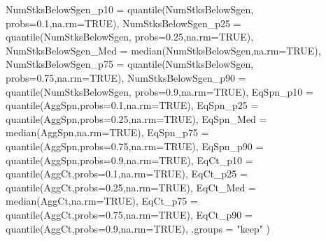 \documentclass[french,11pt]{book}
\newenvironment{Shaded}{\begin{snugshade}}{\end{snugshade}}
\newcommand{\AttributeTok}[1]{\textcolor[rgb]{0.77,0.63,0.00}{#1}}
\newcommand{\ConstantTok}[1]{\textcolor[rgb]{0.00,0.00,0.00}{#1}}
\newcommand{\FloatTok}[1]{\textcolor[rgb]{0.00,0.00,0.81}{#1}}
\newcommand{\FunctionTok}[1]{\textcolor[rgb]{0.00,0.00,0.00}{#1}}
\newcommand{\NormalTok}[1]{#1}
\newcommand{\StringTok}[1]{\textcolor[rgb]{0.31,0.60,0.02}{#1}}
\begin{document}
\begin{Shaded}
\begin{Highlighting}[]
              \AttributeTok{NumStksBelowSgen\_p10 =} \FunctionTok{quantile}\NormalTok{(NumStksBelowSgen,}
                       \AttributeTok{probs=}\FloatTok{0.1}\NormalTok{,}\AttributeTok{na.rm=}\ConstantTok{TRUE}\NormalTok{),}
              \AttributeTok{NumStksBelowSgen\_p25 =} \FunctionTok{quantile}\NormalTok{(NumStksBelowSgen,}
                       \AttributeTok{probs=}\FloatTok{0.25}\NormalTok{,}\AttributeTok{na.rm=}\ConstantTok{TRUE}\NormalTok{),}
              \AttributeTok{NumStksBelowSgen\_Med =} \FunctionTok{median}\NormalTok{(NumStksBelowSgen,}\AttributeTok{na.rm=}\ConstantTok{TRUE}\NormalTok{),}
              \AttributeTok{NumStksBelowSgen\_p75 =} \FunctionTok{quantile}\NormalTok{(NumStksBelowSgen,}
                       \AttributeTok{probs=}\FloatTok{0.75}\NormalTok{,}\AttributeTok{na.rm=}\ConstantTok{TRUE}\NormalTok{),}
              \AttributeTok{NumStksBelowSgen\_p90 =} \FunctionTok{quantile}\NormalTok{(NumStksBelowSgen,}
                       \AttributeTok{probs=}\FloatTok{0.9}\NormalTok{,}\AttributeTok{na.rm=}\ConstantTok{TRUE}\NormalTok{),}
              \AttributeTok{EqSpn\_p10 =} \FunctionTok{quantile}\NormalTok{(AggSpn,}\AttributeTok{probs=}\FloatTok{0.1}\NormalTok{,}\AttributeTok{na.rm=}\ConstantTok{TRUE}\NormalTok{),}
              \AttributeTok{EqSpn\_p25 =} \FunctionTok{quantile}\NormalTok{(AggSpn,}\AttributeTok{probs=}\FloatTok{0.25}\NormalTok{,}\AttributeTok{na.rm=}\ConstantTok{TRUE}\NormalTok{),}
              \AttributeTok{EqSpn\_Med =} \FunctionTok{median}\NormalTok{(AggSpn,}\AttributeTok{na.rm=}\ConstantTok{TRUE}\NormalTok{),}
              \AttributeTok{EqSpn\_p75 =} \FunctionTok{quantile}\NormalTok{(AggSpn,}\AttributeTok{probs=}\FloatTok{0.75}\NormalTok{,}\AttributeTok{na.rm=}\ConstantTok{TRUE}\NormalTok{),}
              \AttributeTok{EqSpn\_p90 =} \FunctionTok{quantile}\NormalTok{(AggSpn,}\AttributeTok{probs=}\FloatTok{0.9}\NormalTok{,}\AttributeTok{na.rm=}\ConstantTok{TRUE}\NormalTok{),}
              \AttributeTok{EqCt\_p10 =} \FunctionTok{quantile}\NormalTok{(AggCt,}\AttributeTok{probs=}\FloatTok{0.1}\NormalTok{,}\AttributeTok{na.rm=}\ConstantTok{TRUE}\NormalTok{),}
              \AttributeTok{EqCt\_p25 =} \FunctionTok{quantile}\NormalTok{(AggCt,}\AttributeTok{probs=}\FloatTok{0.25}\NormalTok{,}\AttributeTok{na.rm=}\ConstantTok{TRUE}\NormalTok{),}
              \AttributeTok{EqCt\_Med =} \FunctionTok{median}\NormalTok{(AggCt,}\AttributeTok{na.rm=}\ConstantTok{TRUE}\NormalTok{),}
              \AttributeTok{EqCt\_p75 =} \FunctionTok{quantile}\NormalTok{(AggCt,}\AttributeTok{probs=}\FloatTok{0.75}\NormalTok{,}\AttributeTok{na.rm=}\ConstantTok{TRUE}\NormalTok{),}
              \AttributeTok{EqCt\_p90 =} \FunctionTok{quantile}\NormalTok{(AggCt,}\AttributeTok{probs=}\FloatTok{0.9}\NormalTok{,}\AttributeTok{na.rm=}\ConstantTok{TRUE}\NormalTok{),}
              \AttributeTok{.groups =} \StringTok{"keep"}
\NormalTok{    )}


\end{Highlighting}
\end{Shaded}
\end{document}
